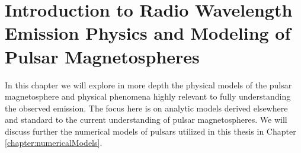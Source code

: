 \chapter[Introduction: Radio and Pulsars]{Introduction to Radio Wavelength Emission Physics and Modeling of Pulsar Magnetospheres}
\label{chapter:radioAndPulsars}
In this chapter we will explore in more depth the physical models of the pulsar magnetosphere and 
physical phenomena highly relevant to fully understanding
the observed emission.  The focus here is
on analytic models derived elsewhere and 
standard to the current understanding
of pulsar magnetospheres.  
We will discuss further the numerical models of pulsars
utilized in this thesis in Chapter \ref{chapter:numericalModels}. 






